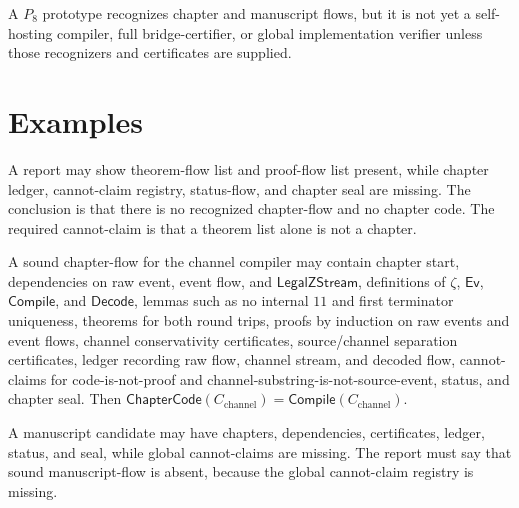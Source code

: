 \begin{corollary}
\label{cor:chapter-manuscript-p8-not-higher}
A $P_8$ prototype recognizes chapter and manuscript flows, but it is not yet a self-hosting compiler, full bridge-certifier, or global implementation verifier unless those recognizers and certificates are supplied.
\end{corollary}

\section{Examples}
\label{sec:chapter-manuscript-examples}

\begin{example}
\label{ex:chapter-manuscript-theorem-list-only}
A report may show theorem-flow list and proof-flow list present, while chapter ledger, cannot-claim registry, status-flow, and chapter seal are missing. The conclusion is that there is no recognized chapter-flow and no chapter code. The required cannot-claim is that a theorem list alone is not a chapter.
\end{example}

\begin{example}
\label{ex:chapter-manuscript-sound-compiler-chapter}
A sound chapter-flow for the channel compiler may contain chapter start, dependencies on raw event, event flow, and $\mathsf{LegalZStream}$, definitions of $\zeta$, $\mathsf{Ev}$, $\mathsf{Compile}$, and $\mathsf{Decode}$, lemmas such as no internal $11$ and first terminator uniqueness, theorems for both round trips, proofs by induction on raw events and event flows, channel conservativity certificates, source/channel separation certificates, ledger recording raw flow, channel stream, and decoded flow, cannot-claims for code-is-not-proof and channel-substring-is-not-source-event, status, and chapter seal. Then $\mathsf{ChapterCode}(C_{\mathrm{channel}})=\mathsf{Compile}(C_{\mathrm{channel}})$.
\end{example}

\begin{example}
\label{ex:chapter-manuscript-missing-global-cannot-claims}
A manuscript candidate may have chapters, dependencies, certificates, ledger, status, and seal, while global cannot-claims are missing. The report must say that sound manuscript-flow is absent, because the global cannot-claim registry is missing.
\end{example}


